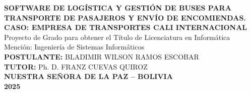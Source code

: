 \begin{titlepage}
\begin{center}
		{\textbf{SOFTWARE DE LOGÍSTICA Y GESTIÓN DE BUSES PARA TRANSPORTE DE PASAJEROS Y ENVÍO DE ENCOMIENDAS.\\
		CASO: EMPRESA DE TRANSPORTES CALI INTERNACIONAL}}\\
		{Proyecto de Grado para obtener el Título de Licenciatura en Informática}\\
		Mención: Ingeniería de Sistemas Informáticos\\
		
		\textbf{POSTULANTE:} BLADIMIR WILSON RAMOS ESCOBAR\\
		\textbf{TUTOR:} Ph. D. FRANZ CUEVAS QUIROZ\\
		\textbf{NUESTRA SEÑORA DE LA PAZ – BOLIVIA}\\
		\textbf{2025}\\
	\end{center}
\end{titlepage}